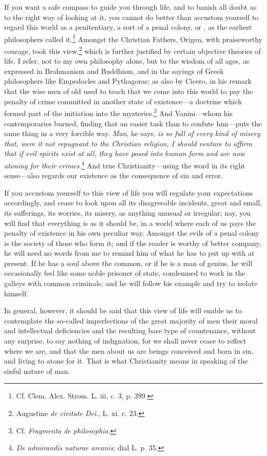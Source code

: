 If you want a safe compass to guide you through life, and to banish
all doubt as to the right way of looking at it, you cannot do better
than accustom yourself to regard this world as a penitentiary, a sort
of a penal colony, or , as the earliest philosophers
called it.\footnote{Cf. Clem. Alex. Strom. L. iii, c. 3, p. 399.}
Amongst the Christian Fathers, Origen, with praiseworthy courage, took
this view,\footnote{Augustine \textit{de civitate Dei}., L. xi. c.
23.} which is further justified by certain objective theories of life.
I refer, not to my own philosophy alone, but to the wisdom of all
ages, as expressed in Brahmanism and Buddhism, and in the sayings of
Greek philosophers like Empedocles and Pythagoras; as also by Cicero,
in his remark that the wise men of old used to teach that we come into
this world to pay the penalty of crime committed in another state of
existence---a  doctrine which formed part of the initiation
into the mysteries.\footnote{Cf. \textit{Fragmenta de philosophia}.}
And Vanini---whom his contemporaries burned, finding that an easier
task than to confute him---puts the same thing in a very forcible way.
\textit{Man}, he says, \textit{is so full of every kind of misery
that, were it not repugnant to the Christian religion, I should
venture to affirm that if evil spirits exist at all, they have posed
into human form and are now atoning for their
crimes}.\footnote{\textit{De admirandis naturae arcanis}; dial L. p.
35.} And true Christianity---using the word in its right sense---also
regards our existence as the consequence of sin and error.

If you accustom yourself to this view of life you will regulate your
expectations accordingly, and cease to look upon all its disagreeable
incidents, great and small, its sufferings, its worries, its misery,
as anything unusual or irregular; nay, you will find that everything
is as it should be, in a world where each of us pays the penalty of
existence in his own peculiar way. Amongst the evils of a penal colony
is the society of those who form it; and if the reader is worthy of
better company, he will need no words from me to remind him of what he
has to put up with at present. If he has a soul above the common, or
if he is a man of genius, he will occasionally feel like some noble
prisoner of state, condemned to work in the galleys with common
criminals; and he will follow his example and try to isolate himself.

In general, however, it should be said that this view of life will
enable us to contemplate the so-called imperfections of the great
majority of men  their moral and intellectual deficiencies
and the resulting base type of countenance, without any surprise, to
say nothing of indignation; for we shall never cease to reflect where
we are, and that the men about us are beings conceived and born in
sin, and living to atone for it. That is what Christianity means in
speaking of the sinful nature of man.

